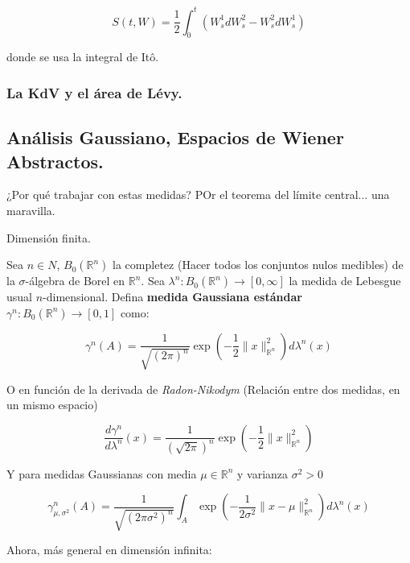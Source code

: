 \[
	S(t, W) = \frac{1}{2} \int_0^t (W_s^1 dW_s^2 - W_s^2 dW_s^1)
\]

donde se usa la integral de Itô.

\subsubsection{La KdV y el área de Lévy.}




\subsection{Análisis Gaussiano, Espacios de Wiener Abstractos.}



¿Por qué trabajar con estas medidas? POr el teorema del límite central... una maravilla.


Dimensión finita. 

\begin{boxDef}
	Sea $n \in N$, $B_0 (\mathbb{R}^n)$ la completez (Hacer todos los conjuntos nulos medibles) de la $\sigma$-álgebra de Borel en $\mathbb{R}^n$. Sea $\lambda^n: B_0 (\mathbb{R}^n) \rightarrow [0, \infty]$ la medida de Lebesgue usual $n$-dimensional. Defina \textbf{medida Gaussiana estándar} $\gamma^n: B_0 (\mathbb{R}^n) \rightarrow [0,1]$ como:

	\[
		\gamma^n (A) = \frac{1}{\sqrt{(2\pi)^n}} \exp \left( -\frac{1}{2} \lVert x \rVert_{\mathbb{R}^n}^2 \right) d \lambda^n (x)
	\]
\end{boxDef}

O en función de la derivada de \textit{Radon-Nikodym} (Relación entre dos medidas, en un mismo espacio)

\[
	\frac{d\gamma^n}{d\lambda^n} (x) = \frac{1}{(\sqrt{2\pi})^n} \exp\left( -\frac{1}{2} \lVert x \rVert_{\mathbb{R}^n}^2 \right)
\]

Y para medidas Gaussianas con media $\mu \in \mathbb{R}^n$ y varianza $\sigma^2 > 0$

\[
	\gamma_{\mu, \sigma^2}^n (A) = \frac{1}{\sqrt{(2\pi \sigma^2)^n}} \int_A \exp\left( -\frac{1}{2\sigma^2} \lVert x - \mu \rVert_{\mathbb{R}^n}^2 \right) d\lambda^n (x)
\]

Ahora, más general en dimensión infinita:


